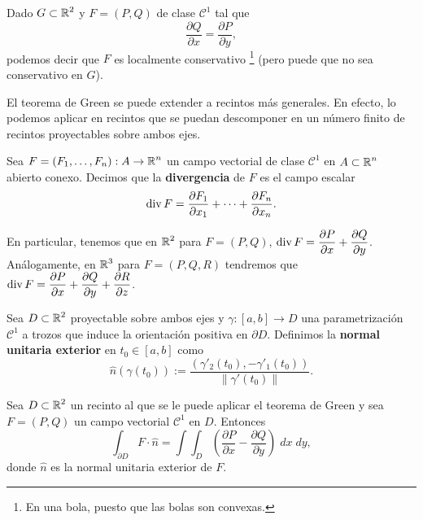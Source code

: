 \begin{observation}
Dado $\displaystyle G \subset \mathbb{R}^{2} $ y $\displaystyle F = \left(P, Q\right) $ de clase $\displaystyle \mathcal{C}^{1} $ tal que 
\[\frac{\partial Q}{\partial x}= \frac{\partial P}{\partial y} ,\]
podemos decir que $\displaystyle F $ es localmente conservativo \footnote{En una bola, puesto que las bolas son convexas.} (pero puede que no sea conservativo en $\displaystyle G $). 
\end{observation}
\begin{observation}
El teorema de Green se puede extender a recintos más generales. En efecto, lo podemos aplicar en recintos que se puedan descomponer en un número finito de recintos proyectables sobre ambos ejes.
\end{observation}
\begin{definition}
Sea $\displaystyle F=\left(F_{1}, \ldots, F_{n}\right): A \to \mathbb{R}^{n} $ un campo vectorial de clase $\displaystyle \mathcal{C}^{1} $ en $\displaystyle A \subset \mathbb{R}^{n} $ abierto conexo. Decimos que la \textbf{divergencia} de $\displaystyle F $ es el campo escalar
\[\operatorname{div} F = \frac{\partial F_{1}}{\partial x_{1}} + \cdots + \frac{\partial F_{n}}{\partial x_{n}} .\]
\end{definition}
\begin{observation}
En particular, tenemos que en $\displaystyle \mathbb{R}^{2} $ para $\displaystyle F = \left(P, Q\right) $, $\displaystyle \operatorname{div} F = \frac{\partial P}{\partial x}+ \frac{\partial Q}{\partial y} $. Análogamente, en $\displaystyle \mathbb{R}^{3} $ para $\displaystyle F = \left(P, Q, R\right) $ tendremos que $\displaystyle \operatorname{div} F = \frac{\partial P}{\partial x}+ \frac{\partial Q}{\partial y} + \frac{\partial R}{\partial z} $. 
\end{observation}
\begin{definition}
	Sea $\displaystyle D \subset \mathbb{R}^{2} $ proyectable sobre ambos ejes y $\displaystyle \gamma: \left[a,b\right] \to D $ una parametrización $\displaystyle \mathcal{C}^{1} $ a trozos que induce la orientación positiva en $\displaystyle \partial D $. Definimos la \textbf{normal unitaria exterior} en $\displaystyle t_{0}\in \left[a,b\right]  $ como
	\[\hat{n}\left(\gamma\left(t_{0}\right)\right) := \frac{\left(\gamma'_{2}\left(t_{0}\right), -\gamma'_{1}\left(t_{0}\right)\right)}{\|\gamma'\left(t_{0}\right)\|} .\]
\end{definition}
\begin{theorem}
Sea $\displaystyle D \subset \mathbb{R}^{2} $ un recinto al que se le puede aplicar el teorema de Green y sea $\displaystyle F = \left(P,Q\right) $ un campo vectorial $\displaystyle \mathcal{C}^{1} $ en $\displaystyle D $. Entonces
\[\int _{\partial D}F \cdot \hat{n} =\int \int _{D}\left(\frac{\partial P}{\partial x}-\frac{\partial Q}{\partial y}\right) \; dx \; dy ,\]
donde $\displaystyle \hat{n} $ es la normal unitaria exterior de $\displaystyle F $. 
\end{theorem}
